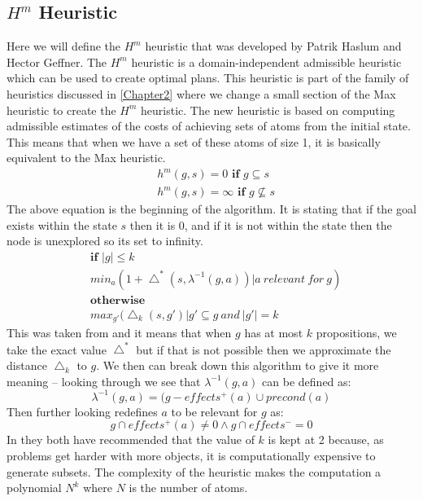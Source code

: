 \subsection{$H^m$ Heuristic} 
Here we will define the $H^m$ heuristic that was developed by Patrik Haslum and Hector Geffner\cite{AdmissibleHeuristic}. The $H^m$ heuristic is a domain-independent admissible heuristic which can be used to create optimal plans. This heuristic is part of the family of heuristics discussed in \ref{Chapter2} where we change a small section of the Max heuristic to create the $H^m$ heuristic. 
The new heuristic is based on computing admissible estimates of the costs of achieving sets of atoms from the initial state\cite{AdmissibleHeuristic}. This means that when we have a set of these atoms of size 1, it is basically equivalent to the Max heuristic.
\begin{equation}
\begin{aligned}
& h^m(g,s) = 0 \textbf{ if } g \subseteq s\\
& h^m(g,s) = \infty \textbf{ if } g \not\subseteq s
\end{aligned}
\end{equation}
The above equation is the beginning of the algorithm. It is stating that if the goal exists within the state $s$ then it is 0, and if it is not within the state then the node is unexplored so its set to infinity.
\begin{equation}
\begin{aligned}
& \textbf{if } |g| \leq k\\
& min_a (1 + \bigtriangleup^*(s, \lambda^{-1}(g,a)) | a\ relevant\ for\ g)\\
& \textbf{otherwise}\\
& max_{g'}(\bigtriangleup_k(s,g') | g'\subseteq g\ and\ |g'| = k
\end{aligned}
\end{equation} 
This was taken from \cite{PlanningBook} and it means that when $g$ has at most $k$ propositions, we take the exact value $\bigtriangleup^*$ but if that is not possible then we approximate the distance $\bigtriangleup_k$ to $g$. 
We then can break down this algorithm to give it more meaning – looking through \cite{PlanningBook} we see that $\lambda^{-1}(g,a)$ can be defined as:
\begin{equation}
\lambda^{-1}(g,a) = (g - effects^+(a) \cup precond(a)
\end{equation}  
Then further looking redefines $a$ to be relevant for $g$	 as:
\begin{equation} 
g \cap effects^+(a) \neq 0 \wedge g \cap effects^- = 0
\end{equation}
In\cite{PlanningBook}\cite{AdmissibleHeuristic} they both have recommended that the value of $k$ is kept at 2 because, as problems get harder with more objects, it is computationally expensive to generate subsets. The complexity of the heuristic makes the computation a polynomial $N^k$ where $N$ is the number of atoms. 
